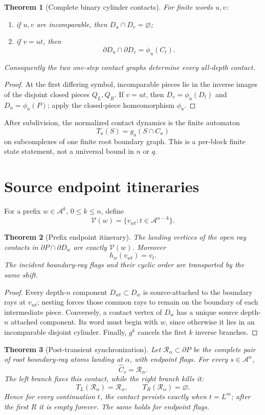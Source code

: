 \documentclass[11pt]{article}
\newtheorem{theorem}{Theorem}[section]
\theoremstyle{definition}
\theoremstyle{remark}
\newcommand{\A}{\mathcal A}
\begin{document}
\begin{theorem}[Complete binary cylinder contacts]
For finite words $u,v$:
\begin{enumerate}
\item if $u,v$ are incomparable, then $D_u\cap D_v=\varnothing$;
\item if $v=ut$, then
\[
 \boxed{\partial D_u\cap\partial D_v=\phi_u(C_t).}
\]
\end{enumerate}
Consequently the two one-step contact graphs determine every all-depth contact.
\end{theorem}

\begin{proof}
At the first differing symbol, incomparable pieces lie in the inverse images of
the disjoint closed pieces $Q_L,Q_R$.  If $v=ut$, then
$D_v=\phi_u(D_t)$ and $D_u=\phi_u(P)$; apply the closed-piece homeomorphism
$\phi_u$.
\end{proof}

After subdivision, the normalized contact dynamics is the finite automaton
\[
 T_a(S)=g_a(S\cap C_a)
\]
on subcomplexes of one finite root boundary graph.  This is a per-block finite
state statement, not a universal bound in $n$ or $q$.

\section{Source endpoint itineraries}
For a prefix $w\in\A^k$, $0\le k\le n$, define
\[
 \mathcal V(w)=\{v_{wt}:t\in\A^{n-k}\}.
\]

\begin{theorem}[Prefix endpoint itinerary]
The landing vertices of the open ray contacts in
$\partial P\cap\partial D_w$ are exactly $\mathcal V(w)$.  Moreover
\[
 \boxed{h_w(v_{wt})=v_t.}
\]
The incident boundary-ray flags and their cyclic order are transported by the
same shift.
\end{theorem}

\begin{proof}
Every depth-$n$ component $D_{wt}\subset D_w$ is source-attached to the
boundary rays at $v_{wt}$; nesting forces those common rays to remain on the
boundary of each intermediate piece.  Conversely, a contact vertex of $D_w$
has a unique source depth-$n$ attached component.  Its word must begin with
$w$, since otherwise it lies in an incomparable disjoint cylinder.  Finally,
$g^k$ cancels the first $k$ inverse branches.
\end{proof}

\begin{theorem}[Post-transient synchronization]
Let $\mathscr R_\alpha\subset\partial P$ be the complete pair of root
boundary-ray atoms landing at $\alpha$, with endpoint flags.  For every
$s\in\A^n$,
\[
 \widehat C_s=\mathscr R_\alpha.
\]
The left branch fixes this contact, while the right branch kills it:
\[
 T_L(\mathscr R_\alpha)=\mathscr R_\alpha,
 \qquad
 T_R(\mathscr R_\alpha)=\varnothing.
\]
Hence for every continuation $t$, the contact persists exactly when
$t=L^m$; after the first $R$ it is empty forever.  The same holds for endpoint
flags.
\end{theorem}
\end{document}

